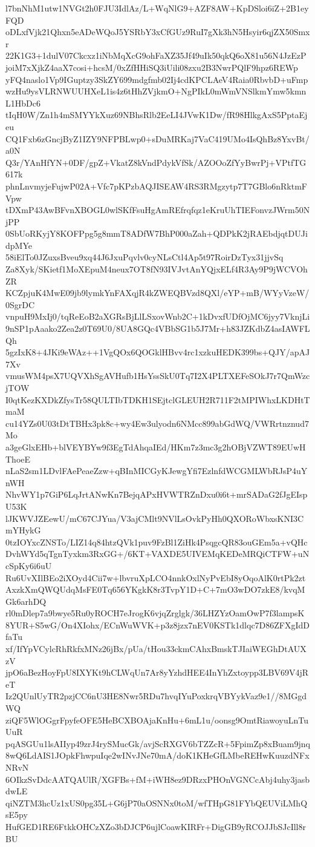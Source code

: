 l7bnNhM1utw1NVGt2h0FJU3IdlAz/L+WqNlG9+AZF8AW+KpDSloi6iZ+2B1eyFQD
oDLxfVjk21Qhxn5eADeWQoJ5YSRbY3xCfGUz9RuI7gXk3hN5Hsyir6qjZX50Smxr
22K1G3+1dulV07Ckcxz1iNbMqXcG9ohFaXZ35Jf49uIk50qkQ6oX81u56N4JzEzP
joiM7xXjkZ4aaX7cosi+hcsM/0xZfHHiSQ3iUili08zxu2B3NwrPQlF9hpz6REWp
yFQ4naslo1Vp9IGuptzy3SkZY699mdgfmb02Ij4cdKPCLAeV4Raia0RbvbD+uFmp
wzHu9ysVLRNWUUHXeL1is4z6tHhZVjkmO+NgPIkL0mWmVNSlkmYmw5kmnL1HbDc6
tIqH0W/Zn1h4mSMYYkXuz69NBhsRlb2EeLI4JVwK1Dw/fR98HlkgAxS5PptaEjeu
CQ1Fxb6zGncjByZ1IZY9NFPBLwp0+sDuMRKaj7VaC419UMo4IsQhBz8YxvBt/a0N
Q3r/YAnHfYN+0DF/gpZ+VkatZ8kVndPdykVfSk/AZOOoZfYyBwrPj+VPtfTG617k
phnLnvmyjeFujwP02A+Vfc7pKPzbAQJISEAW4RS3RMgzytp7T7GBlo6nRktmFVpw
tDXmP43AwBFvnXBOGL0wlSKfFsuHgAmREfrqfqz1eKruUhTIEFonvzJWrm50NjPP
0SbUoRKyjY8KOFPpg5g8mmT8ADfW7BhP000aZah+QDPkK2jRAEbdjqtDUJidpMYe
58iElTo0JZuxsBveu9xq44J6JxuPqvlv0cyNLsCtl4Ap5t97RoirDzTyx31jjvSq
Za8Xyk/SKietf1MoXEpuM4neux7OT8fN93IVJvtAnYQjxELf4R3Ay9P9jWCVOhZR
KCZpjuK4MwE09jb9lymkYnFAXqjR4kZWEQBVzd8QXl/eYP+mB/WYyVzeW/0SgrDC
vnpuH9MxIj0/tqReEoB2aXGRsBjLlLSxovWnb2C+1kDvxfUDfOjMC6jyy7VknjLi
9nSP1pAaako2Zea2z0T69U0/8UA8GQc4VBbSG1b5J7Mr+h83JZKdbZ4asIAWFLQh
5gzIxK8+4JKi9eWAz++1VgQOx6QOGklHBvv4rc1xzkuHEDK399bs+QJY/apAJ7Xv
vmusWM4psX7UQVXhSgAVHufb1HsYssSkU0Tq7I2X4PLTXEFeSOkJ7r7QmWzcjTOW
I0qtKezKXDkZfysTr58QULTIbTDKH1SEjtclGLEUH2R711F2tMPIWhxLKDHtTmaM
cu14YZs0U03tDtTBHx3pk8c+wy4Ew3ulyodn6NMcc899abGdWQ/VWRrtnznud7Mo
a3geGlxEHb+blVEYBYw9f3EgTdAhqaIEd/HKm7z3mc3g2hOBjVZWT89EUwHThoeE
nLaS2sm1LDvlFAePeaeZzw+qBInMICGyKJewgYfi7EzlnfdWCGMLWbRJsP4uYnWH
NhvWY1p7GiP6LqJrtANwKn7BejqAPxHVWTRZnDxu0i6t+mrSADaG2fJgEIspU53K
lJKWVJZEewU/mC67CJYua/V3ajCMlt9NVlLsOvkPyHh0QXORoWbxsKNI3CmYHykG
0tzIOYxcZNSTo/LIZ14q84htzQVk1puv9FzBl1ZiHk4PsqgcQR83ouGEm5a+vQHc
DvhWYd5qTgnTyxkm3RxGG+/6KT+VAXDE5UIVEMqKEDeMRQiCTFW+uNcSpKy6i6uU
Ru6UvXIlBEo2iXOyd4Cii7w+lbvruXpLCO4nnkOxlNyPvEbI8yOqoAlK0rtPk2zt
AxzkXmQWQUdqMsFE0Tq656YKgkK8r3TvpY1D+C+7mO3wDO7zkE8/kvqMGk6arhDQ
rl0mDlep7a9bwye5Ru0yROCH7eJrogK6vjqZrglgk/36LHZYzOamOwP7f3lampsK
8YUR+S5wG/On4XIohx/ECnWuWVK+p3z8jzx7nEV0KSTk1dlqc7D86ZFXgIdDfaTu
xf/IfYpVCylcRhRkfxMNz26jBx/pUa/tHou33ckmCAhxBmskTJIaiWEGhDtAUXzV
jpO6aBezHoyFpU8IXYKt9hCLWqUn7Ar8yYzhdHEE4InYhZxtoypp3LBV69V4jReT
Iz2QUnlUyTR2pzjCC6nU3HE8Nwr5RDu7hvqIYuPoxkrqVBYykVaz9e1//8MGgdWQ
ziQF5WlOGgrFpyfeOFE5HeBCXBOAjaKnHu+6mL1u/oonsg9OmtRiawoyuLnTuUuR
pqASGUu1lsAIIyp49zrJ4rySMucGk/avjScRXGV6bTZZcR+5FpimZp8xBuam9jnq
8wQ6LdAIS1JOpkFhwpuIqe2wINvJNe70mA/doK1KHeGfLMbeREHwKuuzdNFxNRvN
6OIkzSvDdcAATQAUlR/XGFBs+fM+iWH8ez9DRzxPHOnVGNCcAbj4uhy3jasbdwLE
qiNZTM3hcUz1xUS0pg35L+G6jP70aOSNNx0toM/wfTHpG81FYbQEUViLMhQsE5py
HufGED1RE6FtkkOHCzXZo3bDJCP6ujlCoawKIRFr+DigGB9yRCOJJbSJcIll8rBU
